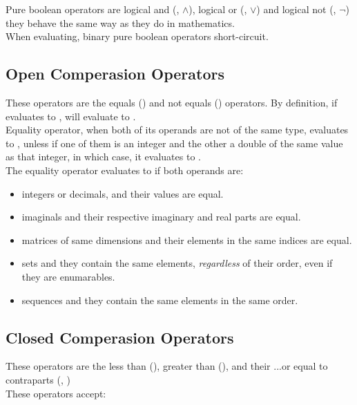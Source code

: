 \documentclass[11pt,a4paper]{book}
\begin{document}
Pure boolean operators are logical and (\code{\&}, $\land$), logical or (\code{|}, $\lor$) and logical not (\code{\textbackslash}, $\lnot$) they behave the same way as they do in mathematics. \\

When evaluating, binary pure boolean operators short-circuit.

\subsection{Open Comperasion Operators}

These operators are the equals (\code{=}) and not equals (\code{\textbackslash}) operators. By definition, if  evaluates to ,  will evaluate to . \\

Equality operator, when both of its operands are not of the same type, evaluates to , unless if one of them is an integer and the other a double of the same value as that integer, in which case, it evaluates to . \\

The equality operator evaluates to  if both operands are:

\begin{itemize}
\itemsep0em
\item integers or decimals, and their values are equal.
\item imaginals and their respective imaginary and real parts are equal.
\item matrices of same dimensions and their elements in the same indices are equal.
\item sets and they contain the same elements, \textit{regardless} of their order, even if they are enumarables.
\item sequences and they contain the same elements in the same order.
\end{itemize}

\subsection{Closed Comperasion Operators}

These operators are the less than (\code{<}), greater than (\code{>}), and their ...or equal to contraparts (\code{<=}, \code{>=}) \\

These operators accept:
\end{document}
